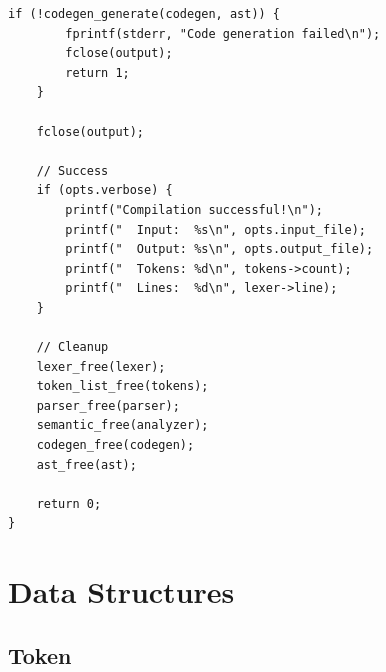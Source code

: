 \documentclass[12pt,a4paper,oneside]{book}
\begin{document}
\begin{lstlisting}[style=c, caption={compiler.c - Main Compiler Driver}]
    if (!codegen_generate(codegen, ast)) {
        fprintf(stderr, "Code generation failed\n");
        fclose(output);
        return 1;
    }
    
    fclose(output);
    
    // Success
    if (opts.verbose) {
        printf("Compilation successful!\n");
        printf("  Input:  %s\n", opts.input_file);
        printf("  Output: %s\n", opts.output_file);
        printf("  Tokens: %d\n", tokens->count);
        printf("  Lines:  %d\n", lexer->line);
    }
    
    // Cleanup
    lexer_free(lexer);
    token_list_free(tokens);
    parser_free(parser);
    semantic_free(analyzer);
    codegen_free(codegen);
    ast_free(ast);
    
    return 0;
}
\end{lstlisting}

\section{Data Structures}

\subsection{Token}
\end{document}
